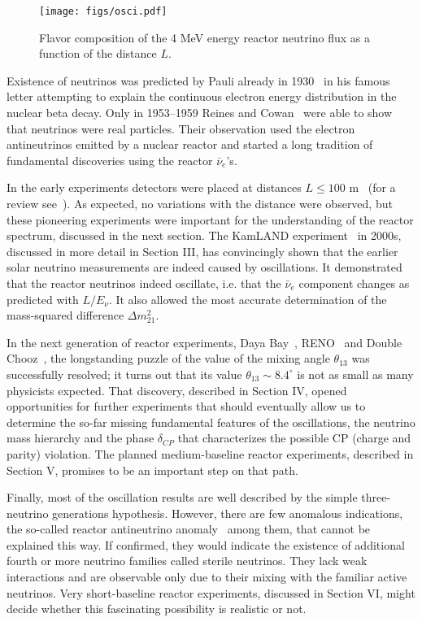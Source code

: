 \begin{figure}[htb]
\begin{centering}
\texttt{[image: figs/osci.pdf]}
\par\end{centering}
\caption{\label{fig:intro1} Flavor composition of the 4 MeV energy reactor neutrino flux as a function of the distance  $L$. }
\end{figure}

Existence of neutrinos was predicted by Pauli already in 1930~\cite{Pauli30} in his famous letter attempting to explain the continuous electron
energy distribution in the nuclear beta decay. Only in 1953--1959 Reines and Cowan~\cite{Reines53,Cowan56,Reines59} were able to show that neutrinos
were real particles. Their observation used the electron antineutrinos emitted by a nuclear reactor and started a long tradition of fundamental
discoveries using the reactor $\bar{\nu}_e$'s.

In the early experiments detectors were placed at distances $L \le 100$ m~\cite{ILL,Gosgen,Rovno,Krasnoyarsk,SRP,Bugey4,Bugey3} (for a review see~\cite{Bemporad02}). As expected, no variations
with the distance were observed, but these pioneering experiments were important for the understanding of the reactor spectrum, discussed
in the next section. The KamLAND experiment~\cite{Kamland03,Kamland05,Kamland08} in 2000s, discussed in more detail in Section III, has convincingly shown that the earlier
solar neutrino measurements are indeed  caused by oscillations. It demonstrated that the reactor neutrinos indeed
oscillate, i.e. that the $\bar{\nu}_e$ component changes as predicted with $L/E_{\nu}$. It also allowed the most accurate determination of the 
mass-squared difference $\Delta m^2_{21}$.  

In the next generation of reactor experiments, Daya Bay~\cite{Dayabay,Dayabay14}, RENO~\cite{Reno}  and Double Chooz~\cite{DChooz,DChooz14}, the longstanding puzzle of the
value of the mixing angle $\theta_{13}$ was successfully resolved; it turns out that its value $\theta_{13} \sim 8.4^\circ$
is not as small as many physicists expected. That discovery, described in Section IV, opened opportunities for further experiments that should  
eventually allow us to determine the so-far missing fundamental features of the oscillations, the neutrino mass hierarchy and the phase $\delta_{CP}$ that characterizes the possible CP (charge and parity) violation. 
The planned medium-baseline reactor experiments, described in Section V,  promises to be an important step on that path.

Finally, most of the oscillation results are well described by the simple three-neutrino generations hypothesis. However, there are few anomalous indications,
the so-called reactor antineutrino anomaly~\cite{Mention} among them, that cannot be explained this way. If confirmed, they would indicate the existence of additional
fourth or more neutrino families called sterile neutrinos. They lack  weak interactions and are observable only due to their mixing with the familiar active neutrinos.  Very short-baseline
reactor experiments, discussed in Section VI, might decide whether this fascinating possibility is realistic or not.
